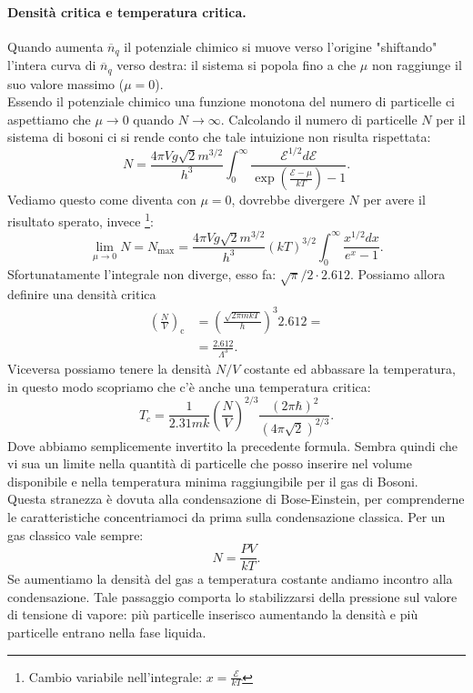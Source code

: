 \paragraph{Densità critica e temperatura critica.}
Quando aumenta $\overline{n}_q$ il potenziale chimico si muove verso l'origine "shiftando" l'intera curva di $\overline{n}_{q}$ verso destra: il sistema si popola fino a che $\mu$ non raggiunge il suo valore massimo ($\mu =0$). \\
Essendo il potenziale chimico una funzione monotona del numero di particelle ci aspettiamo che $\mu \to 0$ quando $N\to \infty$. Calcolando il numero di particelle $N$ per il sistema di bosoni ci si rende conto che tale intuizione non risulta rispettata:
\[
	N = \frac{4\pi V g \sqrt{2} m ^{3 /2}}{h^3}
	\int_{0}^{\infty} \frac{\mathcal{E} ^{1 /2}d\mathcal{E} }
	{\exp\left( \frac{\mathcal{E} -\mu }{kT} \right) -1} 
.\] 
Vediamo questo come diventa con $\mu = 0$, dovrebbe divergere $N$ per avere il risultato sperato, invece \footnote{Cambio variabile nell'integrale: $x = \frac{\mathcal{E} }{kT}$}:
\[
	\lim_{\mu \to 0} N = N_{\text{max}}= \frac{4\pi V g \sqrt{2} m ^{3 /2}}{h^3} \left( kT \right)^{3 /2} \int_{0}^{\infty} \frac{x^{1 /2}dx}{e^{x}-1} \label{eq:N-critico}
.\] 
Sfortunatamente l'integrale non diverge, esso fa: $ \sqrt{\pi} /2 \cdot 2.612$. Possiamo allora definire una densità critica
\[\begin{aligned}
    \left( \frac{N}{V} \right)_{\text{c}} &= \left(\frac{\sqrt{2\pi m kT}}{h}\right)^{3} 2.612 =\\ 
					  &=\frac{2.612}{\Lambda ^3}
.\end{aligned}\]
Viceversa possiamo tenere la densità $N /V$ costante ed abbassare la temperatura, in questo modo scopriamo che c'è anche una temperatura critica:
\[
	T_{c} = \frac{1}{2.31 m k} \left( \frac{N}{V} \right)^{2 /3} \frac{\left( 2\pi \hbar  \right) ^2}{\left( 4\pi \sqrt{2}  \right) ^{2 /3}}
.\] 
Dove abbiamo semplicemente invertito la precedente formula.
Sembra quindi che vi sua un limite nella quantità di particelle che posso inserire nel volume disponibile e nella temperatura minima raggiungibile per il gas di Bosoni. \\
Questa stranezza è dovuta alla condensazione di Bose-Einstein, per comprenderne le caratteristiche concentriamoci da prima sulla condensazione classica. 
Per un gas classico vale sempre:
\[
	N = \frac{PV}{kT}
.\] Se aumentiamo la densità del gas a temperatura costante andiamo incontro alla condensazione. Tale passaggio comporta lo stabilizzarsi della pressione sul valore di tensione di vapore: più particelle inserisco aumentando la densità e più particelle entrano nella fase liquida.
